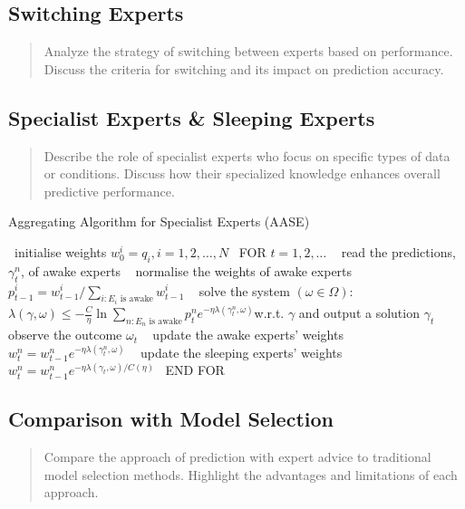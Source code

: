\subsection{Switching Experts}
\begin{quote}
  Analyze the strategy of switching between experts based on performance. Discuss the criteria for switching and its impact on prediction accuracy.
\end{quote}

\subsection{Specialist Experts \& Sleeping Experts}
\begin{quote}
  Describe the role of specialist experts who focus on specific types of data or conditions. Discuss how their specialized knowledge enhances overall predictive performance.
\end{quote}

\begin{algorithm}
  \caption{Aggregating Algorithm for Specialist Experts (AASE)}\label{AAS}
  \begin{algorithmic}[1]
    \State\ initialise weights $w^i_0 = q_i, i = 1, 2, \ldots, N$
    \State\ FOR $t = 1, 2, \ldots$
    \State\ \hspace{\algorithmicindent} read the predictions, $\gamma^n_t$, of awake experts
    \State\ \hspace{\algorithmicindent} normalise the weights of awake experts\newline\hspace*{\algorithmicindent}\hspace{\algorithmicindent} $p^i_{t-1} = w^i_{t-1} / \sum_{i:E_i\text{ is awake}} w^i_{t-1}$
    \State\ \hspace{\algorithmicindent} solve the system $(\omega \in \Omega)$:\newline\hspace*{\algorithmicindent}\hspace{\algorithmicindent}$\lambda(\gamma, \omega) \leq - \frac{C}{\eta} \ln \sum_{n:E_n\text{ is awake}}p^n_{t}e^{-\eta\lambda(\gamma^n_t, \omega)}$\newline\hspace*{\algorithmicindent}\hspace{\algorithmicindent}w.r.t. $\gamma$ and output a solution $\gamma_t$
    \State\ \hspace{\algorithmicindent} observe the outcome $\omega_t$
    \State\ \hspace{\algorithmicindent} update the awake experts' weights $w^n_t = w^n_{t-1}e^{-\eta\lambda(\gamma^n_t,\omega)}$
    \State\ \hspace{\algorithmicindent} update the sleeping experts' weights $w^n_t = w^n_{t-1} e^{-\eta\lambda(\gamma_t, \omega)/C(\eta)}$
    \State\ END FOR
  \end{algorithmic}
\end{algorithm}


\subsection{Comparison with Model Selection}
\begin{quote}
  Compare the approach of prediction with expert advice to traditional model selection methods. Highlight the advantages and limitations of each approach.
\end{quote}